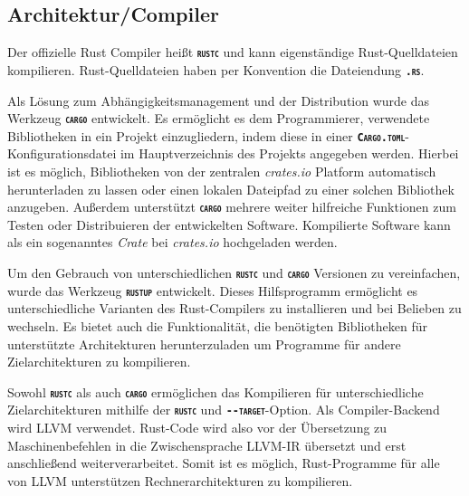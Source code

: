 \subsection{Architektur/Compiler}

Der offizielle Rust Compiler heißt \texttt{\textsc{\textbf{rustc}}} und kann eigenständige Rust-Quelldateien
kompilieren. Rust-Quelldateien haben per Konvention die Dateiendung \texttt{\textsc{\textbf{.rs}}}.\cite{rustBook}

Als Lösung zum Abhängigkeitsmanagement und der Distribution wurde das Werkzeug \texttt{\textsc{\textbf{cargo}}} 
entwickelt. Es ermöglicht es dem Programmierer, verwendete Bibliotheken in ein Projekt einzugliedern,
indem diese in einer \texttt{\textsc{\textbf{Cargo.toml}}}-Konfigurationsdatei im Hauptverzeichnis
des Projekts angegeben werden. Hierbei ist es möglich, Bibliotheken von der zentralen \textit{crates.io}
Platform automatisch herunterladen zu lassen oder einen lokalen Dateipfad zu einer solchen
Bibliothek anzugeben.
Außerdem unterstützt \texttt{\textsc{\textbf{cargo}}} mehrere weiter hilfreiche Funktionen zum Testen oder
Distribuieren der entwickelten Software. Kompilierte Software kann als ein sogenanntes \textit{Crate} bei
\textit{crates.io} hochgeladen werden.\cite{rustBook}

Um den Gebrauch von unterschiedlichen \texttt{\textsc{\textbf{rustc}}} und \texttt{\textsc{\textbf{cargo}}} Versionen 
zu vereinfachen, wurde das Werkzeug \texttt{\textsc{\textbf{rustup}}} entwickelt. Dieses
Hilfsprogramm ermöglicht es unterschiedliche Varianten des Rust-Compilers zu installieren und bei Belieben zu
wechseln. Es bietet auch die Funktionalität, die benötigten Bibliotheken für unterstützte Architekturen
herunterzuladen um Programme für andere Zielarchitekturen zu kompilieren.

Sowohl \texttt{\textsc{\textbf{rustc}}} als auch \texttt{\textsc{\textbf{cargo}}} ermöglichen das Kompilieren für
unterschiedliche Zielarchitekturen mithilfe der \texttt{\textsc{\textbf{rustc}}} und
\texttt{\textsc{\textbf{-{}-target}}}-Option. Als Compiler-Backend wird LLVM verwendet.
Rust-Code wird also vor der Übersetzung zu Maschinenbefehlen in die Zwischensprache
LLVM-IR übersetzt und erst anschließend weiterverarbeitet. Somit ist es möglich, Rust-Programme für alle von LLVM
unterstützen Rechnerarchitekturen zu kompilieren.





